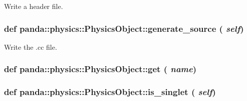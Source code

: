 \label{classpanda_1_1physics_1_1PhysicsObject_a89cba40b340a08acb2f22fc52b89b847}
\begin{DoxyVerb}
Write a header file.
\end{DoxyVerb}
 \hypertarget{classpanda_1_1physics_1_1PhysicsObject_a487d99a30ce7c2d2fca1416b29b2c94f}{
\subsubsection[{generate\_\-source}]{\setlength{\rightskip}{0pt plus 5cm}def panda::physics::PhysicsObject::generate\_\-source ( {\em self})}}
\label{classpanda_1_1physics_1_1PhysicsObject_a487d99a30ce7c2d2fca1416b29b2c94f}
\begin{DoxyVerb}
Write the .cc file.
\end{DoxyVerb}
 \hypertarget{classpanda_1_1physics_1_1PhysicsObject_a22fc5429883c27ee042473216e0f38e6}{
\subsubsection[{get}]{\setlength{\rightskip}{0pt plus 5cm}def panda::physics::PhysicsObject::get ( {\em name})}}
\label{classpanda_1_1physics_1_1PhysicsObject_a22fc5429883c27ee042473216e0f38e6}
\hypertarget{classpanda_1_1physics_1_1PhysicsObject_a0640f5ce8e4af9b7d24f49889dbaee12}{
\subsubsection[{is\_\-singlet}]{\setlength{\rightskip}{0pt plus 5cm}def panda::physics::PhysicsObject::is\_\-singlet ( {\em self})}}
\label{classpanda_1_1physics_1_1PhysicsObject_a0640f5ce8e4af9b7d24f49889dbaee12}


